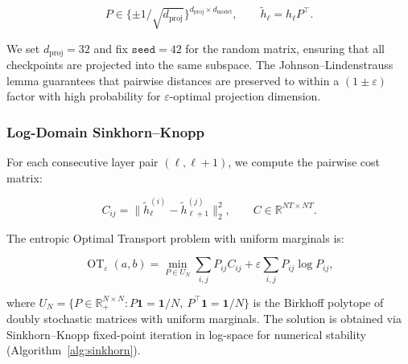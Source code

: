 \documentclass[12pt,twoside]{article}
\newcommand{\OT}{\operatorname{OT}}
\begin{document}
\begin{equation}
  P \in \{\pm 1 / \sqrt{d_{\text{proj}}}\}^{d_{\text{proj}} \times d_{\text{model}}},
  \qquad
  \tilde{h}_\ell = h_\ell P^\top.
\end{equation}

We set \(d_{\text{proj}} = 32\) and fix \(\texttt{seed} = 42\) for the random
matrix, ensuring that all checkpoints are projected into the same subspace.
The Johnson--Lindenstrauss lemma guarantees that pairwise distances are
preserved to within a \((1 \pm \varepsilon)\) factor with high probability
for \(\varepsilon\)-optimal projection dimension.

\subsubsection{Log-Domain Sinkhorn--Knopp}

For each consecutive layer pair \((\ell, \ell+1)\), we compute the pairwise
cost matrix:

\begin{equation}
  C_{ij} = \|\tilde{h}_\ell^{(i)} - \tilde{h}_{\ell+1}^{(j)}\|_2^2,
  \qquad
  C \in \mathbb{R}^{NT \times NT}.
\end{equation}

The entropic Optimal Transport problem with uniform marginals is:

\begin{equation}
  \OT_\varepsilon(a,b) = \min_{P \in U_N} \sum_{i,j} P_{ij} C_{ij}
  + \varepsilon \sum_{i,j} P_{ij} \log P_{ij},
  \label{eq:entropic_ot}
\end{equation}

where \(U_N = \{P \in \mathbb{R}_+^{N \times N} : P\mathbf{1} = \mathbf{1}/N,\
P^\top \mathbf{1} = \mathbf{1}/N\}\) is the Birkhoff polytope of doubly
stochastic matrices with uniform marginals. The solution is obtained via
Sinkhorn--Knopp fixed-point iteration in log-space for numerical stability
(Algorithm~\ref{alg:sinkhorn}).
\end{document}

